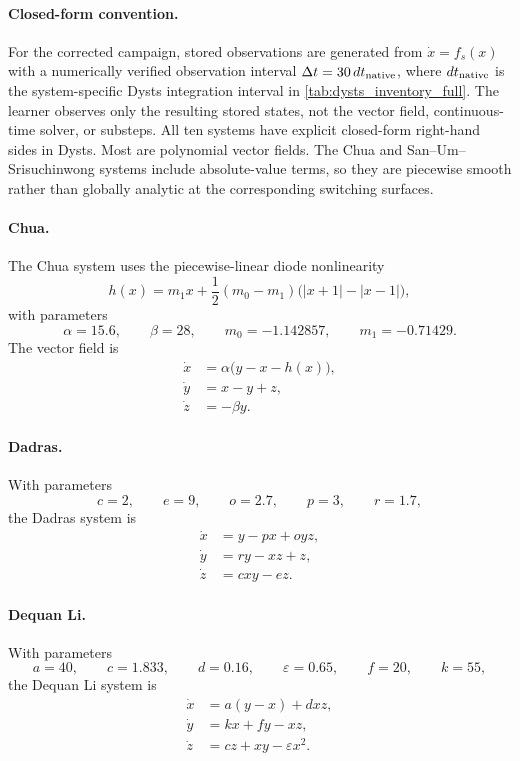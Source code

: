 \paragraph{Closed-form convention.}
For the corrected campaign, stored observations are generated from \(\dot x=f_s(x)\)
with a numerically verified observation interval \(\Delta t=30\,dt_{\rm native}\), where
\(dt_{\rm native}\) is the system-specific Dysts integration interval in
\cref{tab:dysts_inventory_full}. The learner observes only the resulting stored
states, not the vector field, continuous-time solver, or substeps. All ten
systems have explicit closed-form right-hand sides in Dysts. Most are
polynomial vector fields. The Chua and San--Um--Srisuchinwong systems include
absolute-value terms, so they are piecewise smooth rather than globally
analytic at the corresponding switching surfaces.

\paragraph{Chua.}
The Chua system uses the piecewise-linear diode nonlinearity
\[
  h(x)
  =
  m_1x+\frac{1}{2}(m_0-m_1)\bigl(|x+1|-|x-1|\bigr),
\]
with parameters
\[
  \alpha=15.6,\qquad
  \beta=28,\qquad
  m_0=-1.142857,\qquad
  m_1=-0.71429 .
\]
The vector field is
\begin{equation}
\begin{aligned}
  \dot x &= \alpha\bigl(y-x-h(x)\bigr),\\
  \dot y &= x-y+z,\\
  \dot z &= -\beta y .
\end{aligned}
\label{eq:app_dysts_chua}
\end{equation}

\paragraph{Dadras.}
With parameters
\[
  c=2,\qquad e=9,\qquad o=2.7,\qquad p=3,\qquad r=1.7,
\]
the Dadras system is
\begin{equation}
\begin{aligned}
  \dot x &= y-px+oyz,\\
  \dot y &= ry-xz+z,\\
  \dot z &= cxy-ez .
\end{aligned}
\label{eq:app_dysts_dadras}
\end{equation}

\paragraph{Dequan Li.}
With parameters
\[
  a=40,\qquad c=1.833,\qquad d=0.16,\qquad
  \varepsilon=0.65,\qquad f=20,\qquad k=55,
\]
the Dequan Li system is
\begin{equation}
\begin{aligned}
  \dot x &= a(y-x)+dxz,\\
  \dot y &= kx+fy-xz,\\
  \dot z &= cz+xy-\varepsilon x^2 .
\end{aligned}
\label{eq:app_dysts_dequan_li}
\end{equation}

